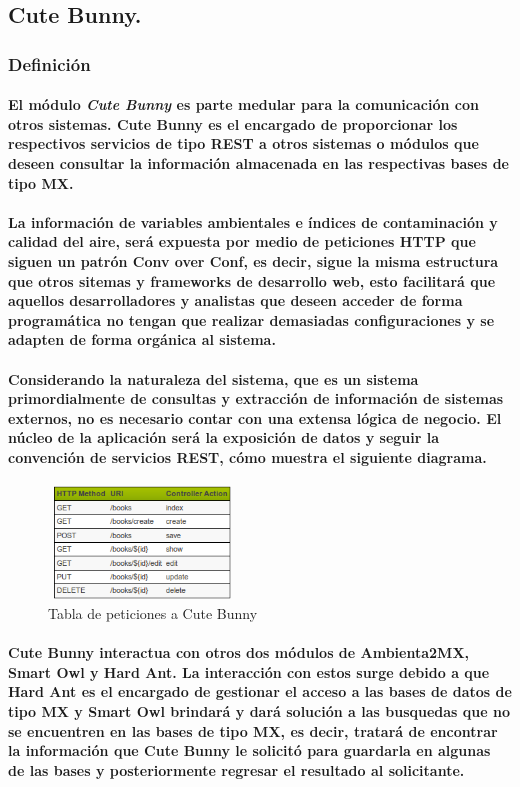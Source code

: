   \subsection{Cute Bunny.}
  	\subsubsection{Definición}
  	\paragraph{El módulo \textbf{\emph{Cute Bunny}} es parte medular para la comunicación con otros sistemas. Cute Bunny es el encargado de proporcionar los respectivos servicios de tipo REST a otros sistemas o módulos que deseen consultar la información almacenada en las respectivas bases de tipo MX.}
  	\paragraph{La información de variables ambientales e índices de contaminación y calidad del aire, será expuesta por medio de peticiones HTTP que siguen un patrón Conv over Conf, es decir, sigue la misma estructura que otros sitemas y frameworks de desarrollo web, esto facilitará que aquellos desarrolladores y analistas que deseen acceder de forma programática no tengan que realizar demasiadas configuraciones y se adapten de forma orgánica al sistema.}
  	\paragraph{Considerando la naturaleza del sistema, que es un sistema primordialmente de consultas y extracción de información de sistemas externos, no es necesario contar con una extensa lógica de negocio. El núcleo de la aplicación será la exposición de datos y seguir la convención de servicios REST, cómo muestra el siguiente diagrama.}
  	\begin{figure}[h!]
  	  \centering
	    \includegraphics[width=5cm,height=3cm]{./images/DiagramaREST.png}
	    \caption{Tabla de peticiones a Cute Bunny}
	\end{figure}
	\paragraph{Cute Bunny interactua con otros dos módulos de Ambienta2MX, Smart Owl y Hard Ant. La interacción con estos surge debido a que Hard Ant es el encargado de gestionar el acceso a las bases de datos de tipo MX y Smart Owl brindará y dará solución a las busquedas que no se encuentren en las bases de tipo MX, es decir, tratará de encontrar la información que Cute Bunny le solicitó para guardarla en algunas de las bases y posteriormente regresar el resultado al solicitante.}
